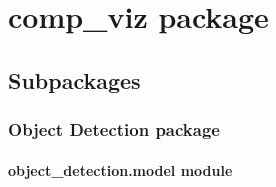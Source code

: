 \documentclass[letterpaper,10pt,english]{sphinxmanual}
\begin{document}
\section{comp\_viz package}
\label{\detokenize{comp_viz:comp-viz-package}}\label{\detokenize{comp_viz::doc}}

\subsection{Subpackages}
\label{\detokenize{comp_viz:subpackages}}
\sphinxstepscope


\subsubsection{Object Detection package}
\label{\detokenize{comp_viz.object_detection:object-detection-package}}\label{\detokenize{comp_viz.object_detection::doc}}

\paragraph{object\_detection.model module}
\label{\detokenize{comp_viz.object_detection:module-comp_viz.object_detection.model}}\label{\detokenize{comp_viz.object_detection:object-detection-model-module}}
\end{document}
